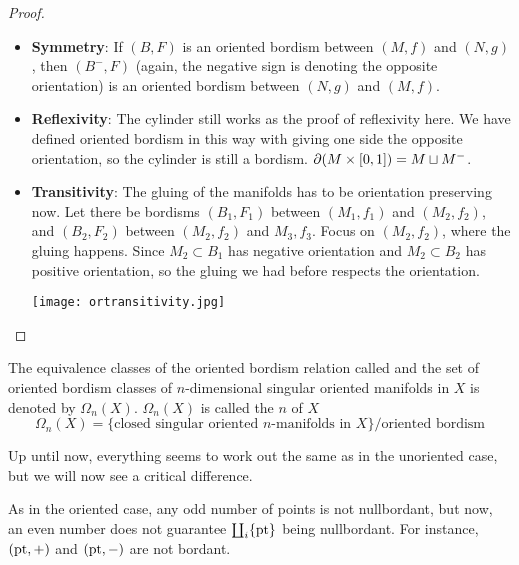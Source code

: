 \documentclass[a4paper,11pt]{article}
\begin{document}
\begin{proof}
    \begin{itemize}
        \item \textbf{Symmetry}: If \((B,F)\) is an oriented bordism between \((M,f)\) and \((N,g)\), then \((B^-,F)\) (again, the negative sign is denoting the opposite orientation) is an oriented bordism between \((N,g)\) and \((M,f)\).
        \item \textbf{Reflexivity}: The cylinder still works as the proof of reflexivity here. We have defined oriented bordism in this way with giving one side the opposite orientation, so the cylinder is still a bordism. \(\partial(M\times [0,1])=M\sqcup M^-\).
        \item \textbf{Transitivity}: The gluing of the manifolds has to be orientation preserving now. Let there be bordisms \((B_1,F_1)\) between \((M_1,f_1)\) and \((M_2,f_2)\), and \((B_2,F_2)\) between \((M_2,f_2)\) and \(M_3,f_3\). Focus on \((M_2,f_2)\), where the gluing happens. Since \(M_2\subset B_1\) has negative orientation and \(M_2\subset B_2\) has positive orientation, so the gluing we had before respects the orientation.
        \begin{center}
        \texttt{[image: ortransitivity.jpg]}
        \end{center}
    \end{itemize}
\end{proof}

\begin{definition}
    The equivalence classes of the oriented bordism relation called  and the set of oriented bordism classes of \(n\)-dimensional singular oriented manifolds in \(X\) is denoted by \(\Omega_n(X)\). \(\Omega_n(X)\) is called the \(n\) of \(X\)
    \[\Omega_n(X)=\{\text{closed singular oriented \(n\)-manifolds in } X\}\big/\text{oriented bordism}\]
\end{definition}

Up until now, everything seems to work out the same as in the unoriented case, but we will now see a critical difference.

\begin{observation}
    As in the oriented case, any odd number of points is not nullbordant, but now, an even number does not guarantee \(\coprod_i\{\mathrm{pt}\}\) being nullbordant. For instance, \((\mathrm{pt},+)\) and \((\mathrm{pt},-)\) are not bordant.
\end{observation}
\end{document}
